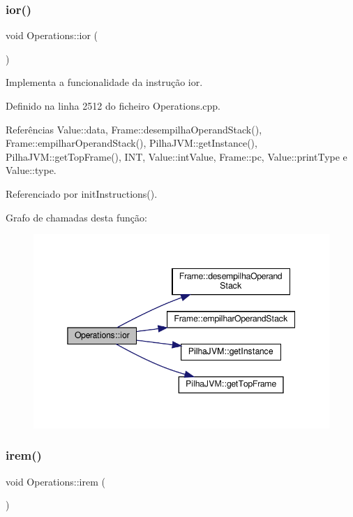 \subsubsection{\texorpdfstring{ior()}{ior()}}
{\footnotesize\ttfamily void Operations\+::ior (\begin{DoxyParamCaption}{ }\end{DoxyParamCaption})\hspace{0.3cm}{\ttfamily [private]}}



Implementa a funcionalidade da instrução ior. 



Definido na linha 2512 do ficheiro Operations.\+cpp.



Referências Value\+::data, Frame\+::desempilha\+Operand\+Stack(), Frame\+::empilhar\+Operand\+Stack(), Pilha\+J\+V\+M\+::get\+Instance(), Pilha\+J\+V\+M\+::get\+Top\+Frame(), I\+NT, Value\+::int\+Value, Frame\+::pc, Value\+::print\+Type e Value\+::type.



Referenciado por init\+Instructions().

Grafo de chamadas desta função\+:\nopagebreak
\begin{figure}[H]
\begin{center}
\leavevmode
\includegraphics[width=345pt]{classOperations_aaa890c310bc7a93e97b2c5004df94e70_cgraph}
\end{center}
\end{figure}
\mbox{\label{classOperations_a510bd2d155695861597a4413b44565bc}} 
\subsubsection{\texorpdfstring{irem()}{irem()}}
{\footnotesize\ttfamily void Operations\+::irem (\begin{DoxyParamCaption}{ }\end{DoxyParamCaption})\hspace{0.3cm}{\ttfamily [private]}}



